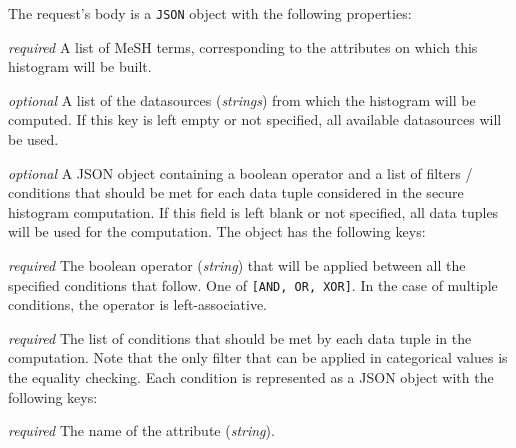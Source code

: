 \begin{description}[labelwidth=5em, leftmargin=\dimexpr\labelwidth+\labelsep\relax]
     \item[Request:] The request's body is a \texttt{JSON} object with the following properties:

\begin{description}[labelwidth=6em, leftmargin=\dimexpr\labelwidth+\labelsep\relax]

    \item[\texttt{attributes}:] {\color{red}\textit{required}} A list of MeSH terms, corresponding to the attributes on which this histogram will be built.

    \item[\texttt{datasources}:] {\color{blue}\textit{optional}} A list of the datasources (\textit{strings}) from which the histogram will be computed.
    If this key is left empty or not specified, all available datasources will be used.

    \item[\texttt{filters}:] {\color{blue}\textit{optional}} A JSON object containing a boolean operator and a list of filters / conditions that should be met for each data tuple considered in the secure histogram computation.
    If this field is left blank or not specified, all data tuples will be used for the computation.
    The object has the following keys:

    \begin{description}[labelwidth=6em, leftmargin=\dimexpr\labelwidth+\labelsep\relax]
        \item[\texttt{operator}:] {\color{red}\textit{required}} The boolean operator (\textit{string}) that will be applied between all the specified conditions that follow.
        One of \texttt{[AND, OR, XOR]}.
        In the case of multiple conditions, the operator is left\hyp associative.

        \item[\texttt{conditions}:] {\color{red}\textit{required}} The list of conditions that should be met by each data tuple in the computation.
        Note that the only filter that can be applied in categorical values is the equality checking.
        Each condition is represented as a JSON object with the following keys:

        \begin{description}[labelwidth=5em, leftmargin=\dimexpr\labelwidth+\labelsep\relax]
            \item[\texttt{attribute}:] {\color{red}\textit{required}} The name of the attribute (\textit{string}).


\end{description}
\end{description}
\end{description}
\end{description}
